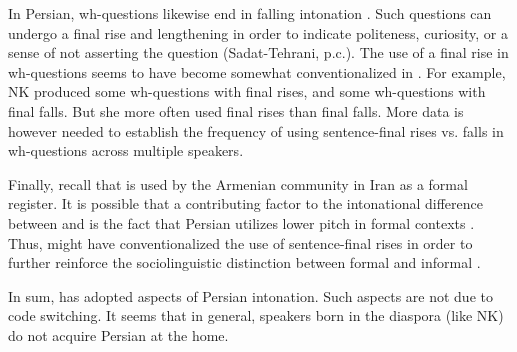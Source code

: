 		In Persian, wh-questions likewise end in falling intonation \citep[118]{sadat-2011-intonationPatternsInterrogativesPersian}. Such questions can undergo a final rise and lengthening in order to indicate politeness, curiosity, or a sense of not asserting the question (Sadat-Tehrani, p.c.).  The use of a final rise in wh-questions seems to have become somewhat conventionalized in {\iaIA}. For example, NK produced some wh-questions with     final rises, and some wh-questions with final falls. But she more often used final rises than final falls.   More data is however needed to establish the frequency of using sentence-final rises vs. falls in wh-questions across multiple speakers. 
		
		Finally, recall that {\seaSEA} is used by the Armenian community in Iran as a formal register. It is possible that a contributing factor to the intonational difference between {\seaSE} and {\iaIA} is the fact that Persian utilizes lower pitch in formal contexts \citep{falahati-2020-acquisitionSegmentalSuprasegmentalFeaturesSecondLanguagePersianPoliteness}. Thus, {\iaIA} might have conventionalized the use of sentence-final rises in order to further reinforce the sociolinguistic distinction between formal {\seaSE} and informal {\iaIA}.  
		
		
		In sum, {\iaIA} has adopted aspects of Persian intonation. Such aspects are not due to code switching. It seems that in general, {\iaIA} speakers born in the diaspora (like NK)   do not acquire Persian at the home. 
